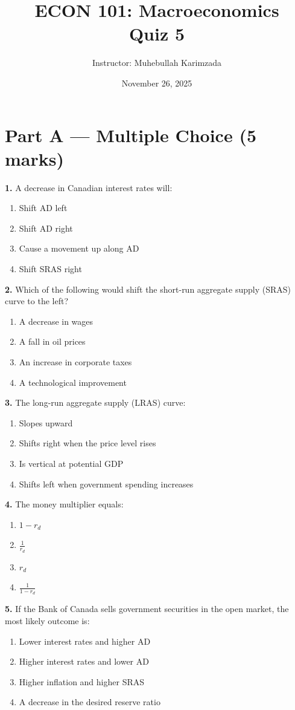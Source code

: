 \documentclass[12pt]{article}
\title{ECON 101: Macroeconomics \\ Quiz 5}
\author{Instructor: Muhebullah Karimzada}
\date{November 26,  2025}
\begin{document}
\maketitle



\section*{Part A — Multiple Choice (5 marks)}



\textbf{1.} A decrease in Canadian interest rates will:
\begin{enumerate}[label=(\Alph*)]
    \item Shift AD left
    \item Shift AD right
    \item Cause a movement up along AD
    \item Shift SRAS right
\end{enumerate}
\vspace{1em}
\textbf{2.} Which of the following would shift the short-run aggregate supply (SRAS) curve to the left?
\begin{enumerate}[label=(\Alph*)]
    \item A decrease in wages
    \item A fall in oil prices
    \item An increase in corporate taxes
    \item A technological improvement
\end{enumerate}
\vspace{1em}
\textbf{3.} The long-run aggregate supply (LRAS) curve:
\begin{enumerate}[label=(\Alph*)]
    \item Slopes upward
    \item Shifts right when the price level rises
    \item Is vertical at potential GDP
    \item Shifts left when government spending increases
\end{enumerate}
\vspace{1em}
\textbf{4.} The money multiplier equals:
\begin{enumerate}[label=(\Alph*)]
    \item $1 - r_d$
    \item $\frac{1}{r_d}$
    \item $r_d$
    \item $\frac{1}{1 - r_d}$
\end{enumerate}
\newpage
\textbf{5.} If the Bank of Canada sells government securities in the open market, the most likely outcome is:
\begin{enumerate}[label=(\Alph*)]
    \item Lower interest rates and higher AD
    \item Higher interest rates and lower AD
    \item Higher inflation and higher SRAS
    \item A decrease in the desired reserve ratio
\end{enumerate}
\end{document}

